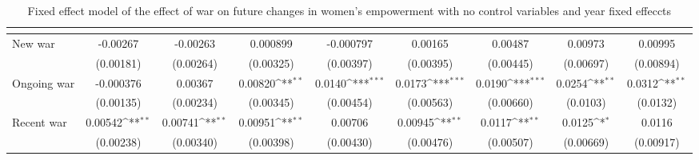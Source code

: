 \begin{table}[htbp]\centering
\def\sym#1{\ifmmode^{#1}\else\(^{#1}\)\fi}
\caption{Fixed effect model of the effect of war on future changes in women's empowerment with no control variables and year fixed effeccts\label{polemprobustsimpyear}}
\begin{tabular}{l*{8}{c}}
\hline\hline
                    &&&&&&&&\\
\hline
New war             &    -0.00267         &    -0.00263         &    0.000899         &   -0.000797         &     0.00165         &     0.00487         &     0.00973         &     0.00995         \\
                    &   (0.00181)         &   (0.00264)         &   (0.00325)         &   (0.00397)         &   (0.00395)         &   (0.00445)         &   (0.00697)         &   (0.00894)         \\
[1em]
Ongoing war         &   -0.000376         &     0.00367         &     0.00820\sym{**} &      0.0140\sym{***}&      0.0173\sym{***}&      0.0190\sym{***}&      0.0254\sym{**} &      0.0312\sym{**} \\
                    &   (0.00135)         &   (0.00234)         &   (0.00345)         &   (0.00454)         &   (0.00563)         &   (0.00660)         &    (0.0103)         &    (0.0132)         \\
[1em]
Recent war          &     0.00542\sym{**} &     0.00741\sym{**} &     0.00951\sym{**} &     0.00706         &     0.00945\sym{**} &      0.0117\sym{**} &      0.0125\sym{*}  &      0.0116         \\
                    &   (0.00238)         &   (0.00340)         &   (0.00398)         &   (0.00430)         &   (0.00476)         &   (0.00507)         &   (0.00669)         &   (0.00917)         \\

\end{tabular}
\end{table}
